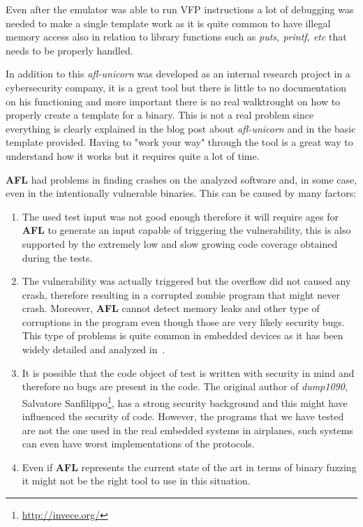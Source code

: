 \documentclass[../main.tex]{subfiles}
\begin{document}
Even after the emulator was able to run VFP instructions a lot of debugging was needed to make a single template work as it is quite common to have illegal memory access also in relation to library functions such as \textit{puts, printf, etc} that needs to be properly handled.

In addition to this \textit{afl-unicorn} was developed as an internal research project in a cybersecurity company, it is a great tool but there is little to no documentation on his functioning and more important there is no real walktrought on how to properly create a template for a binary. This is not a real problem since everything is clearly explained in the blog post about \textit{afl-unicorn} and in the basic template provided. Having to "work your way" through the tool is a great way to understand how it works but it requires quite a lot of time.

\textbf{AFL} had problems in finding crashes on the analyzed software and, in some case, even in the intentionally vulnerable binaries. This can be caused by many factors:

\begin{enumerate}

  \item The used test input was not good enough therefore it will require ages for \textbf{AFL} to generate an input capable of triggering the vulnerability, this is also supported by the extremely low and slow growing code coverage obtained during the tests.

  \item The vulnerability was actually triggered but the overflow did not caused any crash, therefore resulting in a corrupted zombie program that might
  never crash. Moreover, \textbf{AFL} cannot detect memory leaks and other type of corruptions in the program even though those are very likely security bugs.
  This type of problems is quite common in embedded devices as it has been widely detailed and analyzed in~\cite{corrcrash}.

  \item It is possible that the code object of test is written with security in
  mind and therefore no bugs are present in the code. The original author of
  \textit{dump1090}, Salvatore Sanfilippo\footnote{\url{http://invece.org/}}, has a strong security background and this might have influenced the security of code. However, the programs that we have tested are not the one used in the real embedded systems in airplanes, such systems can even have worst implementations of the protocols.

  \item Even if \textbf{AFL} represents the current state of the art in terms of binary fuzzing it might not be the right tool to use in this situation.

\end{enumerate}
\end{document}
